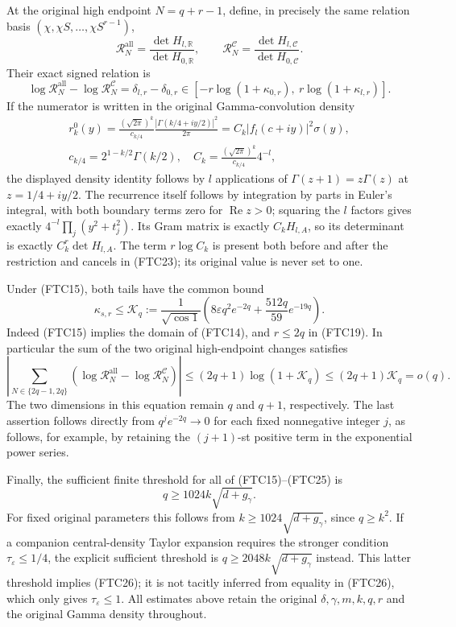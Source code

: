 At the original high endpoint $N=q+r-1$, define, in precisely the same
relation basis $(\chi,\chi S,\ldots,\chi S^{r-1})$,
\[
 \mathcal R_{N}^{\mathrm{all}}=
 \frac{\det H_{l,\mathbb R}}{\det H_{0,\mathbb R}},\qquad
 \mathcal R_N^{\mathcal C}=
 \frac{\det H_{l,\mathcal C}}{\det H_{0,\mathcal C}}.
\]
Their exact signed relation is
\begin{equation}
 \log\mathcal R_N^{\mathrm{all}}-\log\mathcal R_N^{\mathcal C}
 =\delta_{l,r}-\delta_{0,r}
 \in[-r\log(1+\kappa_{0,r}),\ r\log(1+\kappa_{l,r})].
 \tag{FTC23}
\end{equation}
If the numerator is written in the original Gamma-convolution density
\[
\begin{gathered}
 r_k^0(y)=\frac{(\sqrt{2\pi})^k}{c_{k/4}}
 \frac{|\Gamma(k/4+iy/2)|^2}{2\pi}
 =C_k|f_l(c+iy)|^2\sigma(y),\\
 c_{k/4}=2^{1-k/2}\Gamma(k/2),\quad
 C_k=\frac{(\sqrt{2\pi})^k}{c_{k/4}}4^{-l},
\end{gathered}
\]
the displayed density identity follows by $l$ applications of
$\Gamma(z+1)=z\Gamma(z)$ at $z=1/4+iy/2$.
The recurrence itself follows by integration by parts in Euler's integral,
with both boundary terms zero for $\operatorname{Re}z>0$; squaring the
$l$ factors gives exactly $4^{-l}\prod_j(y^2+t_j^2)$.
Its Gram matrix is exactly $C_kH_{l,A}$,
so its determinant is exactly $C_k^r\det H_{l,A}$.  The term
$r\log C_k$ is present both before and after the restriction and cancels
in (FTC23); its original value is never set to one.

Under (FTC15), both tails have the common bound
\begin{equation}
 \kappa_{s,r}\le\mathcal K_q:=
 \frac1{\sqrt{\cos1}}
 \left(8\varepsilon q^2e^{-2q}+\frac{512q}{59}e^{-19q}\right).
 \tag{FTC24}
\end{equation}
Indeed (FTC15) implies the domain of (FTC14), and $r\le2q$ in (FTC19).
In particular the sum of the two original high-endpoint changes satisfies
\begin{equation}
 \left|\sum_{N\in\{2q-1,2q\}}
 \left(\log\mathcal R_N^{\mathrm{all}}-
 \log\mathcal R_N^{\mathcal C}\right)\right|
 \le(2q+1)\log(1+\mathcal K_q)
 \le(2q+1)\mathcal K_q=o(q).
 \tag{FTC25}
\end{equation}
The two dimensions in this equation remain $q$ and $q+1$, respectively.
The last assertion follows directly from $q^j e^{-2q}\to0$ for each
fixed nonnegative integer $j$, as follows, for example, by retaining
the $(j+1)$-st positive term in the exponential power series.

Finally, the sufficient finite threshold for all of (FTC15)--(FTC25) is
\begin{equation}
 q\ge1024k\sqrt{d+g_\gamma}.
 \tag{FTC26}
\end{equation}
For fixed original parameters this follows from
$k\ge1024\sqrt{d+g_\gamma}$, since $q\ge k^2$.
If a companion central-density Taylor expansion requires the stronger
condition $\tau_\varepsilon\le1/4$, the explicit sufficient threshold is
$q\ge2048k\sqrt{d+g_\gamma}$ instead.  This latter threshold implies
(FTC26); it is not tacitly inferred from equality in (FTC26), which only
gives $\tau_\varepsilon\le1$.  All estimates above retain the original
$\delta,\gamma,m,k,q,r$ and the original Gamma density throughout.
